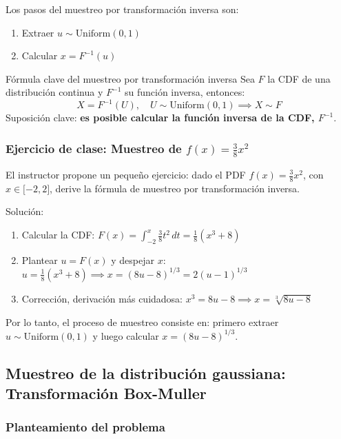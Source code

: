 Los pasos del muestreo por transformación inversa son:

\begin{enumerate}
    \item Extraer $u \sim \text{Uniform}(0, 1)$
    \item Calcular $x = F^{-1}(u)$
\end{enumerate}

\begin{importantbox}{Fórmula clave del muestreo por transformación inversa}
Sea $F$ la CDF de una distribución continua y $F^{-1}$ su función inversa, entonces:
$$X = F^{-1}(U), \quad U \sim \text{Uniform}(0,1) \implies X \sim F$$
Suposición clave: \textbf{es posible calcular la función inversa de la CDF, $F^{-1}$}.
\end{importantbox}

\subsubsection{Ejercicio de clase: Muestreo de $f(x) = \frac{3}{8}x^2$}

El instructor propone un pequeño ejercicio: dado el PDF $f(x) = \frac{3}{8}x^2$, con $x \in {[}-2, 2{]}$, derive la fórmula de muestreo por transformación inversa.

Solución:
\begin{enumerate}
    \item Calcular la CDF: $F(x) = \int_{-2}^{x} \frac{3}{8}t^2 \, dt = \frac{1}{8}(x^3 + 8)$
    \item Plantear $u = F(x)$ y despejar $x$: $u = \frac{1}{8}(x^3 + 8) \implies x = (8u - 8)^{1/3} = 2(u-1)^{1/3}$
    \item Corrección, derivación más cuidadosa: $x^3 = 8u - 8 \implies x = \sqrt[3]{8u - 8}$
\end{enumerate}

Por lo tanto, el proceso de muestreo consiste en: primero extraer $u \sim \text{Uniform}(0,1)$ y luego calcular $x = (8u - 8)^{1/3}$.

\subsection{Muestreo de la distribución gaussiana: Transformación Box-Muller}

\subsubsection{Planteamiento del problema}

